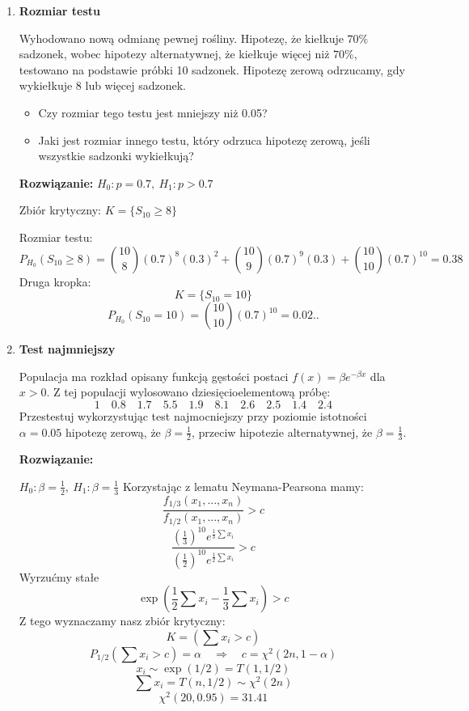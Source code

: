 \documentclass[11pt]{article}
\begin{document}
\begin{enumerate}
    \item \textbf{Rozmiar testu}
    \par 
    Wyhodowano nową odmianę pewnej rośliny. Hipotezę, że kiełkuje \(70\%\) sadzonek, wobec hipotezy alternatywnej, że kiełkuje więcej niż \(70\%\), testowano na podstawie próbki 10 sadzonek. Hipotezę zerową odrzucamy, gdy wykiełkuje 8 lub więcej sadzonek.
    \begin{itemize}
        \item Czy rozmiar tego testu jest mniejszy niż 0.05?
        \item Jaki jest rozmiar innego testu, który odrzuca hipotezę zerową, jeśli wszystkie sadzonki wykiełkują?
    \end{itemize}
    \textbf{Rozwiązanie: }
    \(H_0: p=0.7, \: H_1: p> 0.7\)
    \par 
    Zbiór krytyczny: \(K = \{S_{10} \geq 8\}\)
    \par 
    Rozmiar testu: 
    \[P_{H_0}(S_{10} \geq 8) = \binom{10}{8} (0.7)^8 (0.3)^2 + \binom{10}{9} (0.7)^9 (0.3) + \binom{10}{10} (0.7)^{10} = 0.38\]
    Druga kropka:
    \[K = \{S_{10} = 10\}\]
    \[P_{H_0} (S_{10}=10) = \binom{10}{10} (0.7)^{10} = 0.02..\]
    \item \textbf{Test najmniejszy}
    \par 
    Populacja ma rozkład opisany funkcją gęstości postaci \(f(x) = \beta e^{- \beta x}\) dla \(x>0\). Z tej populacji wylosowano dziesięcioelementową próbę:
    \[1 \quad 0.8 \quad 1.7 \quad 5.5 \quad 1.9 \quad 8.1 \quad 2.6 \quad 2.5 \quad 1.4 \quad 2.4\]
    Przestestuj wykorzystując test najmocniejszy przy poziomie istotności \(\alpha = 0.05\) hipotezę zerową, że \(\beta = \frac{1}{2}\), przeciw hipotezie alternatywnej, że \(\beta = \frac{1}{3}\). 
    \par 
    \textbf{Rozwiązanie: }
    \par 
    \(H_0: \beta = \frac{1}{2}, \: H_1: \beta = \frac{1}{3}\)
    Korzystając z lematu Neymana-Pearsona mamy:
    \[\frac{f_{1/3}(x_1, ..., x_n)}{f_{1/2}(x_1, ..., x_n)} > c\]
    \[\frac{\left(\frac{1}{3} \right)^{10} e^{\frac{1}{3} \sum x_i}}{\left(\frac{1}{2} \right)^{10} e^{\frac{1}{2} \sum x_i}}> c\]
    Wyrzućmy stałe
    \[\exp \left(\frac{1}{2} \sum x_i - \frac{1}{3} \sum x_i \right) >c\]
    Z tego wyznaczamy nasz zbiór krytyczny:
    \[K = (\sum x_i > c)\]
    \[P_{1/2} (\sum x_i > c) = \alpha \quad \Rightarrow \quad c = \chi^2(2n, 1-\alpha)\]
    \[x_i \sim \exp(1/2) = T(1, 1/2)\]
    \[\sum x_i = T(n, 1/2) \sim \chi^2(2n)\]
    \[\chi^2(20, 0.95) = 31.41\]

\end{enumerate}
\end{document}
